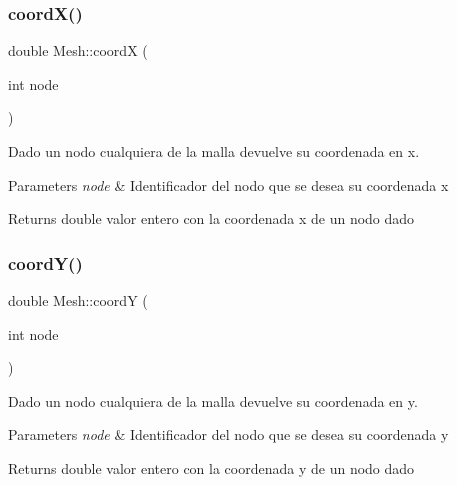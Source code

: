 \subsubsection{\texorpdfstring{coord\+X()}{coordX()}}
{\footnotesize\ttfamily double Mesh\+::coordX (\begin{DoxyParamCaption}\item[{int}]{node }\end{DoxyParamCaption})\hspace{0.3cm}{\ttfamily [inline]}}



Dado un nodo cualquiera de la malla devuelve su coordenada en x. 


\begin{DoxyParams}{Parameters}
{\em node} & Identificador del nodo que se desea su coordenada x \\
\hline
\end{DoxyParams}
\begin{DoxyReturn}{Returns}
double valor entero con la coordenada x de un nodo dado 
\end{DoxyReturn}
\hypertarget{class_mesh_af4f621b62849423e299f681acb4e253c}{}\label{class_mesh_af4f621b62849423e299f681acb4e253c} 
\subsubsection{\texorpdfstring{coord\+Y()}{coordY()}}
{\footnotesize\ttfamily double Mesh\+::coordY (\begin{DoxyParamCaption}\item[{int}]{node }\end{DoxyParamCaption})\hspace{0.3cm}{\ttfamily [inline]}}



Dado un nodo cualquiera de la malla devuelve su coordenada en y. 


\begin{DoxyParams}{Parameters}
{\em node} & Identificador del nodo que se desea su coordenada y \\
\hline
\end{DoxyParams}
\begin{DoxyReturn}{Returns}
double valor entero con la coordenada y de un nodo dado 
\end{DoxyReturn}
\hypertarget{class_mesh_a721990c561955657b21953ea704e4e6d}{}\label{class_mesh_a721990c561955657b21953ea704e4e6d} 
